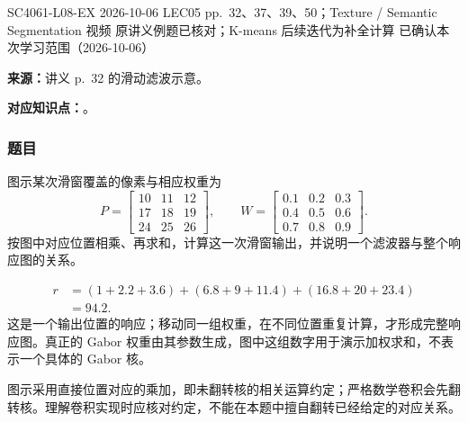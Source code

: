 

\examplemeta
  {SC4061-L08-EX}
  {2026-10-06}
  {LEC05 pp.~32、37、39、50；Texture / Semantic Segmentation 视频}
  {原讲义例题已核对；K-means 后续迭代为补全计算}
  {已确认本次学习范围（2026-10-06）}

\noindent\begin{minipage}{\linewidth}

\textbf{来源：}讲义 p.~32 的滑动滤波示意。

\textbf{对应知识点：}。

\subsubsection*{题目}

图示某次滑窗覆盖的像素与相应权重为
\[
  P=\begin{bmatrix}10&11&12\\17&18&19\\24&25&26\end{bmatrix},\qquad
  W=\begin{bmatrix}0.1&0.2&0.3\\0.4&0.5&0.6\\0.7&0.8&0.9\end{bmatrix}.
\]
按图中对应位置相乘、再求和，计算这一次滑窗输出，并说明一个滤波器与整个响应图的关系。
\end{minipage}\par

\begin{checkedsolution}
\[
\begin{aligned}
  r&=(1+2.2+3.6)+(6.8+9+11.4)+(16.8+20+23.4)\\
   &=\boxed{94.2}.
\end{aligned}
\]
这是一个输出位置的响应；移动同一组权重，在不同位置重复计算，才形成完整响应图。真正的 Gabor 权重由其参数生成，图中这组数字用于演示加权求和，不表示一个具体的 Gabor 核。

图示采用直接位置对应的乘加，即未翻转核的相关运算约定；严格数学卷积会先翻转核。理解卷积实现时应核对约定，不能在本题中擅自翻转已经给定的对应关系。
\end{checkedsolution}

